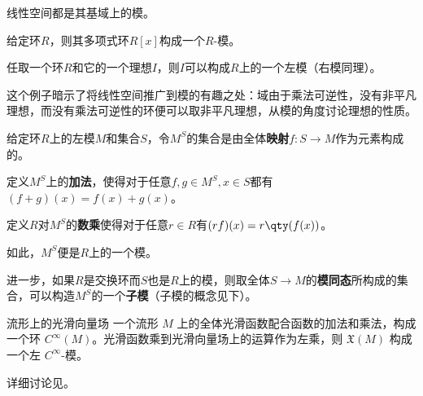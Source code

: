 \begin{example}{}
线性空间都是其基域上的模。
\end{example}

\begin{example}{}
给定环$R$，则其多项式环$R[x]$构成一个$R$-模。
\end{example}



\begin{example}{}

任取一个环$R$和它的一个理想$I$，则$I$可以构成$R$上的一个左模（右模同理）。

这个例子暗示了将线性空间推广到模的有趣之处：域由于乘法可逆性，没有非平凡理想，而没有乘法可逆性的环便可以取非平凡理想，从模的角度讨论理想的性质。

\end{example}


\begin{example}{}

给定环$R$上的左模$M$和集合$S$，令$M^S$的集合是由全体\textbf{映射}$f:S\to M$作为元素构成的。

定义$M^S$上的\textbf{加法}，使得对于任意$f, g\in \phantom{}M^S, x\in S$都有$(f+g)(x)=f(x)+g(x)$。

定义$R$对$M^S$的\textbf{数乘}使得对于任意$r\in R$有$(rf)(x)=r\qty(f(x))$。

如此，$M^S$便是$R$上的一个模。

进一步，如果$R$是交换环而$S$也是$R$上的模，则取全体$S\to M$的\textbf{模同态}所构成的集合，可以构造$M^S$的一个\textbf{子模}（子模的概念见下）。

\end{example}

\begin{example}{流形上的光滑向量场}
一个流形 $M$ 上的全体光滑函数配合函数的加法和乘法，构成一个环 $C^{\infty}(M)$。光滑函数乘到光滑向量场上的运算作为左乘，则 $\mathfrak{X}(M)$ 构成一个左 $C^{\infty}$-模。

详细讨论见。
\end{example}















